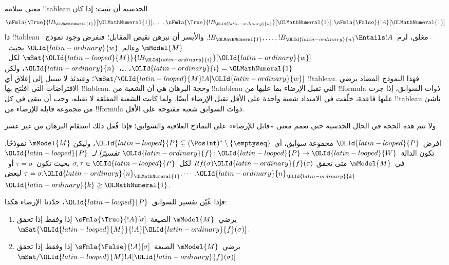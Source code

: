 \documentclass[../../../include/open-logic-section]{subfiles}
\begin{document}


\begin{explain}
  معنى سلامة !!{tableau} الحدسية أن نثبت: إذا كان
  \[
  \sFmla{\True}{!B_{\OLMathNumeral{1}}}[{\OLMathNumeral{1}}], \dots, \sFmla{\True}{!B_{\OLId{latin-ordinary}{n}}}[{\OLMathNumeral{1}}], \sFmla{\False}{!A}[{\OLMathNumeral{1}}]
  \]
  ذا !!{tableau} مغلق، لزم~$!B_{\OLMathNumeral{1}}, \dots, !B_{\OLId{latin-ordinary}{n}} \Entails !A$.
  والأيسر أن نبرهن نقيض المقابل؛ فنفرض وجود نموذج~$\mModel{M}$ وعالم~${\OLId{latin-ordinary}{w}}$
  بحيث~$\mSat{{\OLId{latin-looped}{M}}}{!B_{\OLId{latin-ordinary}{i}}}[{\OLId{latin-ordinary}{w}}]$ لكل~${\OLId{latin-ordinary}{i}}={\OLMathNumeral{1}}$، \dots،~${\OLId{latin-ordinary}{n}}$، ولكن
  $\mSat/{{\OLId{latin-looped}{M}}}{!A}[{\OLId{latin-ordinary}{w}}]$؛ وعندئذ لا سبيل إلى إغلاق أي !!{tableau}. فهذا
  النموذج المضاد يرضي الافتراضات التي افتُتح بها !!{tableau}. وحجة
  البرهان هي أن الشعبة من !!a{tableau} التي تقبل الإرضاء بما عليها من !!{formula} ذوات
  السوابق، إذا جرت عليها قاعدة، خلّفت في الامتداد شعبة واحدة على الأقل
  تقبل الإرضاء أيضًا. ولما كانت الشعبة المغلقة لا تقبله، وجب أن يبقى في
  كل !!{tableau} ناشئ من مجموعة قابلة للإرضاء من !!{formula} ذوات
  السوابق شعبة مفتوحة على الأقل.

  ولا تتم هذه الحجة في الحال الحدسية حتى نعمم معنى «قابل للإرضاء» على
  النماذج العلاقية والسوابق؛ فإذا فُعل ذلك استقام البرهان من غير عسر.
\end{explain}

\begin{defn}
  افرض~${\OLId{latin-looped}{P}}$ مجموعة سوابق، أي
  ${\OLId{latin-looped}{P}} \subseteq (\PosInt)^* \setminus \{\emptyseq\}$، وليكن
  $\mModel{M}$ نموذجًا. تكون الدالة~${\OLId{latin-ordinary}{f}}\colon {\OLId{latin-looped}{P}} \to {\OLId{latin-looped}{W}}$
  \emph{تفسيرًا لـ}~${\OLId{latin-looped}{P}}$ في~$\mModel{M}$ متى تحقق
  $Rf(\sigma){\OLId{latin-ordinary}{f}}(\tau)$ لكل~$\sigma,\tau\in {\OLId{latin-looped}{P}}$ بحيث تكون~$\tau=\sigma$
  أو~$\tau=\sigma.{\OLId{latin-ordinary}{n}}_{\OLMathNumeral{1}}.\cdots.{\OLId{latin-ordinary}{n}}_{\OLId{latin-ordinary}{k}}$ لبعض~${\OLId{latin-ordinary}{k}}\geq {\OLMathNumeral{1}}$.

  فإذا عُيّن تفسير للسوابق~${\OLId{latin-looped}{P}}$، حدّدنا الإرضاء هكذا:
  \begin{enumerate}
  \item يرضي~$\mModel{M}$ الصيغة~$\sFmla{\True}{!A}[\sigma]$ إذا وفقط
    إذا تحقق~$\mSat{{\OLId{latin-looped}{M}}}{!A}[{\OLId{latin-ordinary}{f}}(\sigma)]$.
  \item يرضي~$\mModel{M}$ الصيغة~$\sFmla{\False}{!A}[\sigma]$ إذا وفقط
    إذا تحقق~$\mSat/{{\OLId{latin-looped}{M}}}{!A}[{\OLId{latin-ordinary}{f}}(\sigma)]$.
  \end{enumerate}
\end{defn}
\end{document}
